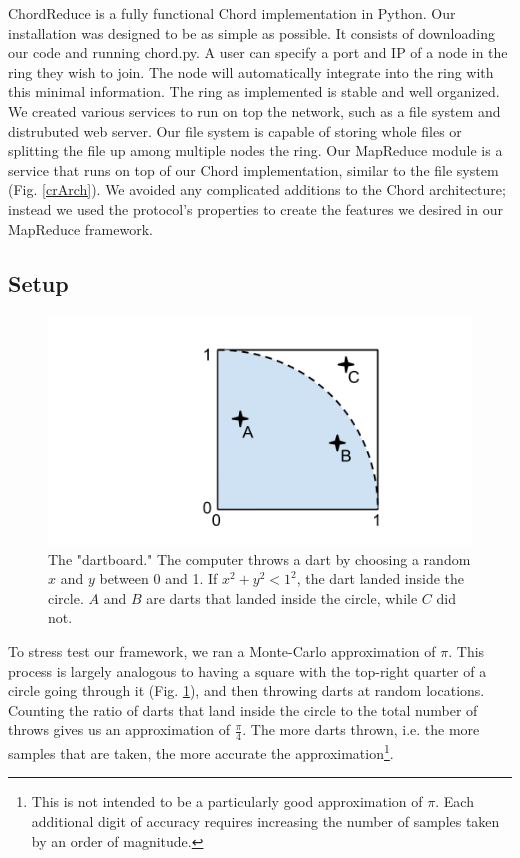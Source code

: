 \documentclass[10pt, conference, compsocconf]{IEEEtran}
\begin{document}
ChordReduce is a fully functional Chord implementation in Python.  Our installation was designed to be as simple as possible.  It consists of downloading our code \cite{code} and running chord.py.  A user can specify a port and IP of a node in the ring they wish to join.  The node will automatically integrate into the ring with this minimal information.  The ring as implemented is stable and well organized.  We created various services to run on top the network, such as a file system and distrubuted web server.  Our file system is capable of storing whole files or splitting the file up among multiple nodes the ring.  Our MapReduce module is a service that runs on top of our Chord implementation, similar to the file system (Fig. \ref{crArch}).  We avoided any complicated additions to the Chord architecture; instead we used the protocol's properties to create the features we desired in our MapReduce framework. 





\subsection{Setup}

\begin{figure}
    \includegraphics[width=\linewidth]{dartboard}
    \caption{The "dartboard." The computer throws a dart by choosing a random $x$ and $y$ between 0 and 1.  If $x^{2} + y^{2} < 1^{2} $, the dart landed inside the circle.  $A$ and $B$ are darts that landed inside the circle, while $C$ did not.}
    \label{dartboard}
\end{figure}

To stress test our framework, we ran a Monte-Carlo approximation of $\pi$. This process is largely analogous to having a square with the top-right quarter of a circle going through it (Fig. \ref{dartboard}), and then throwing darts at random locations.  Counting the ratio of darts that land inside the circle to the total number of throws gives us an approximation of $\frac{\pi}{4}$.  The more darts thrown, i.e. the more samples that are taken, the more accurate the approximation\footnote{This is not intended to be a particularly good approximation of $\pi$. Each additional digit of accuracy requires increasing the number of samples taken by an order of magnitude.}.
\end{document}
